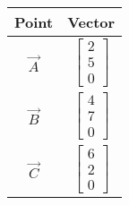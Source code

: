 \begin{center}
\begin{tabular}{|c|c|}
\hline
Point & Vector \\
\hline
$\vec{A}$ & $\begin{bmatrix} 2 \\ 5 \\ 0 \end{bmatrix}$ \\
\hline
$\vec{B}$ & $\begin{bmatrix} 4 \\ 7 \\ 0 \end{bmatrix}$ \\
\hline
$\vec{C}$ & $\begin{bmatrix} 6 \\ 2 \\ 0 \end{bmatrix}$ \\
\hline
\end{tabular}
\end{center}